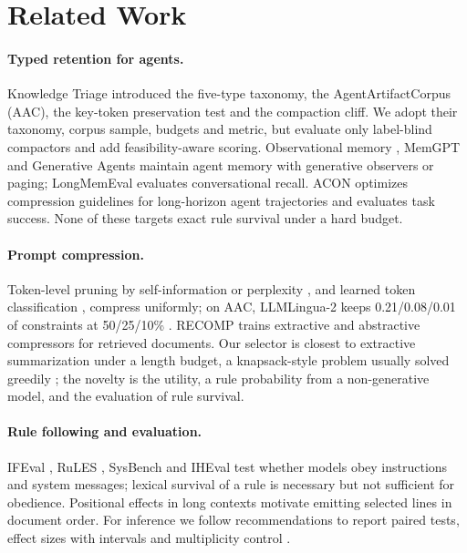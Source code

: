 \documentclass[11pt,a4paper]{article}
\begin{document}
\section{Related Work}
\paragraph{Typed retention for agents.} Knowledge Triage \citep{zerhoudi2026cliff} introduced the five-type taxonomy, the AgentArtifactCorpus (AAC), the key-token preservation test and the compaction cliff. We adopt their taxonomy, corpus sample, budgets and metric, but evaluate only label-blind compactors and add feasibility-aware scoring. Observational memory \citep{mastra2026observational}, MemGPT \citep{packer2023memgpt} and Generative Agents \citep{park2023generative} maintain agent memory with generative observers or paging; LongMemEval \citep{wu2025longmemeval} evaluates conversational recall. ACON \citep{kang2026acon} optimizes compression guidelines for long-horizon agent trajectories and evaluates task success. None of these targets exact rule survival under a hard budget.

\paragraph{Prompt compression.} Token-level pruning by self-information \citep{li2023selective} or perplexity \citep{jiang2023llmlingua,jiang2024longllmlingua}, and learned token classification \citep{pan2024llmlingua2}, compress uniformly; on AAC, LLMLingua-2 keeps 0.21/0.08/0.01 of constraints at 50/25/10\% \citep{zerhoudi2026cliff}. RECOMP \citep{xu2024recomp} trains extractive and abstractive compressors for retrieved documents. Our selector is closest to extractive summarization under a length budget, a knapsack-style problem usually solved greedily \citep{mcdonald2007study,lin2011submodular}; the novelty is the utility, a rule probability from a non-generative model, and the evaluation of rule survival.

\paragraph{Rule following and evaluation.} IFEval \citep{zhou2023ifeval}, RuLES \citep{mu2023rules}, SysBench \citep{qin2024sysbench} and IHEval \citep{zhang2025iheval} test whether models obey instructions and system messages; lexical survival of a rule is necessary but not sufficient for obedience. Positional effects in long contexts \citep{liu2024lost} motivate emitting selected lines in document order. For inference we follow recommendations to report paired tests, effect sizes with intervals and multiplicity control \citep{dror2018hitchhiker,card2020power,miller2024errorbars}.
\end{document}
